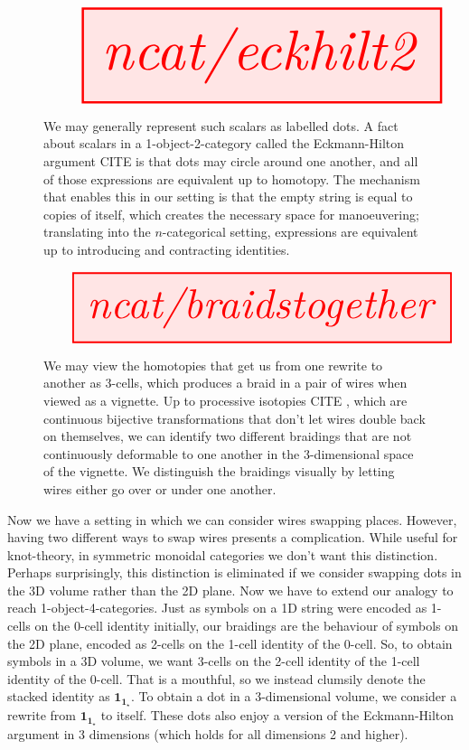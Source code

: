 \begin{figure}
\centering
\[\resizebox{\textwidth}{!}{\tikzfig{ncat/eckhilt2}}\]
\caption{We may generally represent such scalars as labelled dots. A fact about scalars in a 1-object-2-category called the Eckmann-Hilton argument \bR CITE \e is that dots may circle around one another, and all of those expressions are equivalent up to homotopy. The mechanism that enables this in our setting is that the empty string is equal to copies of itself, which creates the necessary space for manoeuvering; translating into the $n$-categorical setting, expressions are equivalent up to introducing and contracting identities.}
\end{figure}

\begin{figure}[h!]
\centering
\[\resizebox{\textwidth}{!}{\tikzfig{ncat/braidstogether}}\]
\caption{We may view the homotopies that get us from one rewrite to another as 3-cells, which produces a braid in a pair of wires when viewed as a vignette. Up to processive isotopies \bR CITE \e, which are continuous bijective transformations that don't let wires double back on themselves, we can identify two different braidings that are not continuously deformable to one another in the 3-dimensional space of the vignette. We distinguish the braidings visually by letting wires either go over or under one another.}
\end{figure}

\newpage

Now we have a setting in which we can consider wires swapping places. However, having two different ways to swap wires presents a complication. While useful for knot-theory, in symmetric monoidal categories we don't want this distinction. Perhaps surprisingly, this distinction is eliminated if we consider swapping dots in the 3D volume rather than the 2D plane. Now we have to extend our analogy to reach 1-object-4-categories. Just as symbols on a 1D string were encoded as 1-cells on the 0-cell identity initially, our braidings are the behaviour of symbols on the 2D plane, encoded as 2-cells on the 1-cell identity of the 0-cell. So, to obtain symbols in a 3D volume, we want 3-cells on the 2-cell identity of the 1-cell identity of the 0-cell. That is a mouthful, so we instead clumsily denote the stacked identity as $\textbf{1}_{\textbf{1}_\star}$. To obtain a dot in a 3-dimensional volume, we consider a rewrite from $\textbf{1}_{\textbf{1}_\star}$ to itself. These dots also enjoy a version of the Eckmann-Hilton argument in 3 dimensions (which holds for all dimensions 2 and higher).

